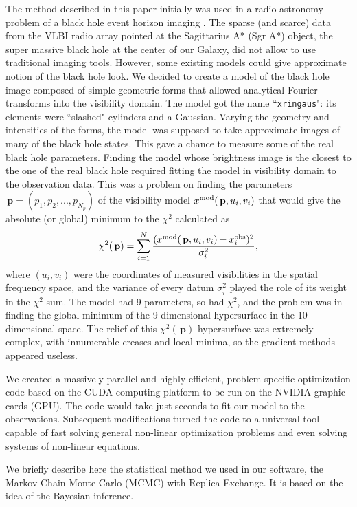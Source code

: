 \documentclass[preprint2]{aastex}
\newcommand{\bfp}{\,\mathbf{p}}
\begin{document}
The method described in this paper initially was used in a radio astronomy problem of a black hole event horizon imaging \citep{BenkevBHM}. The sparse (and scarce) data from the VLBI radio array pointed at the Sagittarius A* (Sgr A*) object, the super massive black hole at the center of our Galaxy, did not allow to use traditional imaging tools. However, some existing models could give approximate notion of the black hole look. We decided to create a model of the black hole image composed of simple geometric forms that allowed analytical Fourier transforms into the visibility domain. The model got the name ``\verb|xringaus|": its elements were ``slashed" cylinders and a Gaussian. Varying the geometry and intensities of the forms, the model was supposed to take approximate images of many of the black hole states. This gave a chance to measure some of the real black hole parameters. Finding the model whose brightness image is the closest to the one of the real black hole required fitting the model in visibility domain to the observation data. This was a problem on finding the parameters $\bfp=(p_1,p_2,...,p_{N_p})$ of the visibility model $x^{\rm mod}(\bfp,u_i,v_i)$ that would give the absolute (or global) minimum to the $\chi^2$ calculated as
\begin{equation}
  \label{chi2}
  \chi^2(\bfp) = \sum_{i=1}^{N} \frac{(x^{\rm mod}(\bfp,u_i,v_i) - x_i^{\rm obs})^2}{\sigma_i^2},
\end{equation}
where $(u_i,v_i)$ were the coordinates of measured visibilities in the spatial frequency space, and the variance of every datum $\sigma_i^2$ played the role of its weight in the $\chi^2$ sum. The model had 9 parameters, so had $\chi^2$, and the problem was in finding the global minimum of the 9-dimensional hypersurface in the 10-dimensional space. The relief of this $\chi^2(\bfp)$ hypersurface was extremely complex, with innumerable creases and local minima, so the gradient methods appeared useless. 

We created a massively parallel and highly efficient, problem-specific optimization code based on the CUDA computing platform to be run on the NVIDIA graphic cards (GPU). The code would take just seconds to fit our model to the observations. Subsequent modifications turned the code to a universal tool capable of fast solving general non-linear optimization problems and even solving systems of non-linear equations. 

We briefly describe here the statistical method we used in our software, the Markov Chain Monte-Carlo (MCMC) with Replica Exchange. It is based on the idea of the Bayesian inference. 
\end{document}
